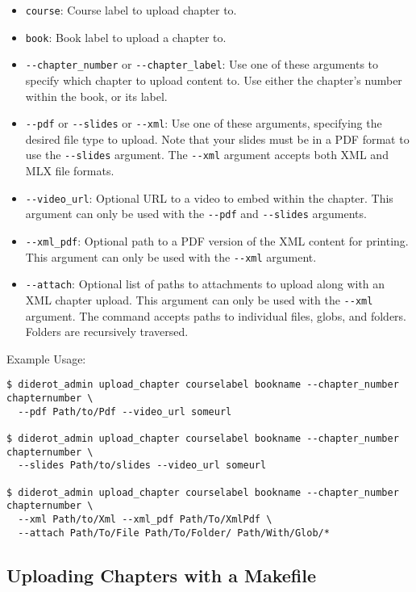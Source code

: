 \begin{itemize}
  \item \verb|course|: Course label to upload chapter to.
  \item \verb|book|: Book label to upload a chapter to.

  \item \verb|--chapter_number| or \verb|--chapter_label|: Use one of these arguments to specify which chapter to upload content to. Use either the chapter's number within the book, or its label.

  \item \verb|--pdf| or \verb|--slides| or \verb|--xml|: Use one of these arguments, specifying the desired file type to upload. Note that your slides must be in a PDF format to use the \verb|--slides| argument. The \verb|--xml| argument accepts both XML and MLX file formats.

  \item \verb|--video_url|: Optional URL to a video to embed within the chapter. This argument can only be used with the \verb|--pdf| and \verb|--slides| arguments.

  \item \verb|--xml_pdf|: Optional path to a PDF version of the XML content for printing. This argument can only be used with the \verb|--xml| argument.

  \item \verb|--attach|: Optional list of paths to attachments to upload along with an XML chapter upload. This argument can only be used with the \verb|--xml| argument. The command accepts paths to individual files, globs, and folders. Folders are recursively traversed.
\end{itemize}

Example Usage:
\begin{verbatim}
$ diderot_admin upload_chapter courselabel bookname --chapter_number chapternumber \
  --pdf Path/to/Pdf --video_url someurl

$ diderot_admin upload_chapter courselabel bookname --chapter_number chapternumber \
  --slides Path/to/slides --video_url someurl

$ diderot_admin upload_chapter courselabel bookname --chapter_number chapternumber \
  --xml Path/to/Xml --xml_pdf Path/To/XmlPdf \
  --attach Path/To/File Path/To/Folder/ Path/With/Glob/*
\end{verbatim}

\subsection{Uploading Chapters with a Makefile}

